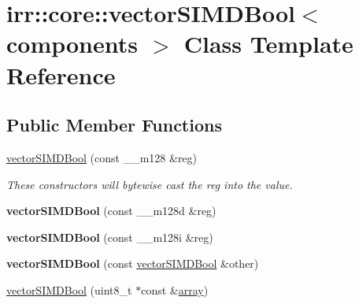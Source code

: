 \hypertarget{classirr_1_1core_1_1vectorSIMDBool}{}\section{irr\+:\+:core\+:\+:vector\+S\+I\+M\+D\+Bool$<$ components $>$ Class Template Reference}
\label{classirr_1_1core_1_1vectorSIMDBool}
\subsection*{Public Member Functions}
\begin{DoxyCompactItemize}
\item 
\hyperlink{classirr_1_1core_1_1vectorSIMDBool_a0f4ee7c74723352fff1d507774603770}{vector\+S\+I\+M\+D\+Bool} (const \+\_\+\+\_\+m128 \&reg)\hypertarget{classirr_1_1core_1_1vectorSIMDBool_a0f4ee7c74723352fff1d507774603770}{}\label{classirr_1_1core_1_1vectorSIMDBool_a0f4ee7c74723352fff1d507774603770}

\begin{DoxyCompactList}\small\item\em These constructors will bytewise cast the reg into the value. \end{DoxyCompactList}\item 
{\bfseries vector\+S\+I\+M\+D\+Bool} (const \+\_\+\+\_\+m128d \&reg)\hypertarget{classirr_1_1core_1_1vectorSIMDBool_a6240d43cadeeb11fde644cfcd6fff609}{}\label{classirr_1_1core_1_1vectorSIMDBool_a6240d43cadeeb11fde644cfcd6fff609}

\item 
{\bfseries vector\+S\+I\+M\+D\+Bool} (const \+\_\+\+\_\+m128i \&reg)\hypertarget{classirr_1_1core_1_1vectorSIMDBool_ac6d55b83c835c1b68d4a99bfc1c26631}{}\label{classirr_1_1core_1_1vectorSIMDBool_ac6d55b83c835c1b68d4a99bfc1c26631}

\item 
{\bfseries vector\+S\+I\+M\+D\+Bool} (const \hyperlink{classirr_1_1core_1_1vectorSIMDBool}{vector\+S\+I\+M\+D\+Bool} \&other)\hypertarget{classirr_1_1core_1_1vectorSIMDBool_a1168b5ff40a0e19cbc002788e86c2531}{}\label{classirr_1_1core_1_1vectorSIMDBool_a1168b5ff40a0e19cbc002788e86c2531}

\item 
\hyperlink{classirr_1_1core_1_1vectorSIMDBool_af95a519d0fafe94ec52fb22f5d7a42d1}{vector\+S\+I\+M\+D\+Bool} (uint8\+\_\+t $\ast$const \&\hyperlink{classirr_1_1core_1_1array}{array})\hypertarget{classirr_1_1core_1_1vectorSIMDBool_af95a519d0fafe94ec52fb22f5d7a42d1}{}\label{classirr_1_1core_1_1vectorSIMDBool_af95a519d0fafe94ec52fb22f5d7a42d1}


\end{DoxyCompactItemize}
